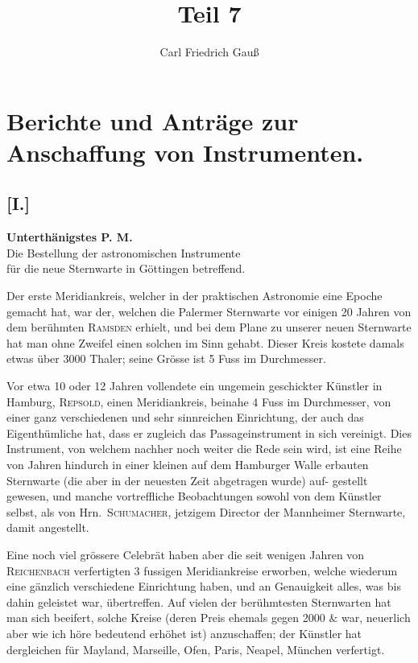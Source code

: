 \documentclass[12pt,a4paper]{article}
\title{Teil 7}
\author{Carl Friedrich Gau\ss}
\date{}
\theoremstyle{plain}
\theoremstyle{definition}
\theoremstyle{remark}
\begin{document}
\maketitle

\section*{Berichte und Antr\"{a}ge zur Anschaffung von Instrumenten.}

\subsection*{[I.]}

\begin{center}
\textbf{Unterth\"{a}nigstes P. M.}\\[0.5em]
Die Bestellung der astronomischen Instrumente\\
f\"{u}r die neue Sternwarte in G\"{o}ttingen betreffend.
\end{center}

Der erste Meridiankreis, welcher in der praktischen Astronomie eine
Epoche gemacht hat, war der, welchen die Palermer Sternwarte vor einigen
20 Jahren von dem ber\"{u}hmten \textsc{Ramsden} erhielt, und bei dem Plane zu unserer
neuen Sternwarte hat man ohne Zweifel einen solchen im Sinn gehabt. Dieser
Kreis kostete damals etwas \"{u}ber 3000 Thaler; seine Gr\"{o}sse ist 5 Fuss im
Durchmesser.

Vor etwa 10 oder 12 Jahren vollendete ein ungemein geschickter K\"{u}nstler
in Hamburg, \textsc{Repsold}, einen Meridiankreis, beinahe 4 Fuss im Durchmesser,
von einer ganz verschiedenen und sehr sinnreichen Einrichtung, der auch das
Eigenth\"{u}mliche hat, dass er zugleich das Passageinstrument in sich vereinigt.
Dies Instrument, von welchem nachher noch weiter die Rede sein wird, ist
eine Reihe von Jahren hindurch in einer kleinen auf dem Hamburger Walle
erbauten Sternwarte (die aber in der neuesten Zeit abgetragen wurde) auf-
gestellt gewesen, und manche vortreffliche Beobachtungen sowohl von dem
K\"{u}nstler selbst, als von Hrn.\ \textsc{Schumacher}, jetzigem Director der Mannheimer
Sternwarte, damit angestellt.

Eine noch viel gr\"{o}ssere Celebr\"{a}t haben aber die seit wenigen Jahren
von \textsc{Reichenbach} verfertigten 3 fussigen Meridiankreise erworben, welche
wiederum eine g\"{a}nzlich verschiedene Einrichtung haben, und an Genauigkeit
alles, was bis dahin geleistet war, \"{u}bertreffen. Auf vielen der ber\"{u}hmtesten
Sternwarten hat man sich beeifert, solche Kreise (deren Preis ehemals gegen
2000 $\mathit{\&}$ war, neuerlich aber wie ich h\"{o}re bedeutend erh\"{o}het ist) anzuschaffen;
der K\"{u}nstler hat dergleichen f\"{u}r Mayland, Marseille, Ofen, Paris, Neapel,
M\"{u}nchen verfertigt.
\end{document}
